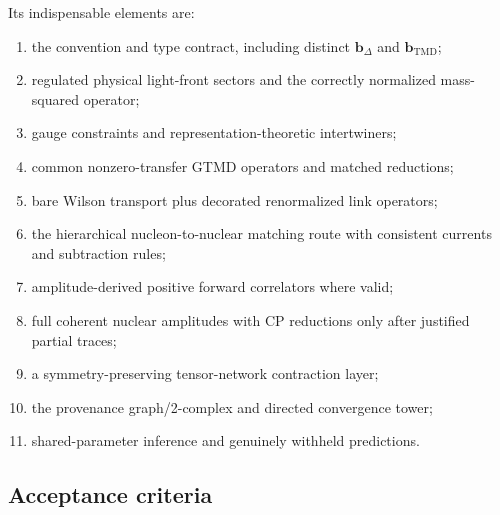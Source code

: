 \documentclass[11pt]{article}
\newcommand{\bD}{\bm{b}_{\Delta}}
\newcommand{\bM}{\bm{b}_{\mathrm{TMD}}}
\begin{document}
Its indispensable elements are:
\begin{enumerate}
\item the convention and type contract, including distinct \(\bD\) and
\(\bM\);
\item regulated physical light-front sectors and the correctly normalized
mass-squared operator;
\item gauge constraints and representation-theoretic intertwiners;
\item common nonzero-transfer GTMD operators and matched reductions;
\item bare Wilson transport plus decorated renormalized link operators;
\item the hierarchical nucleon-to-nuclear matching route with consistent
currents and subtraction rules;
\item amplitude-derived positive forward correlators where valid;
\item full coherent nuclear amplitudes with CP reductions only after justified
partial traces;
\item a symmetry-preserving tensor-network contraction layer;
\item the provenance graph/2-complex and directed convergence tower;
\item shared-parameter inference and genuinely withheld predictions.
\end{enumerate}

\subsection{Acceptance criteria}
\end{document}
